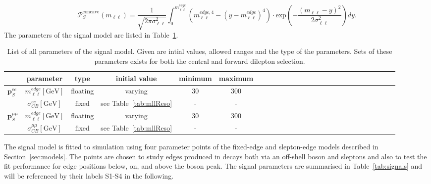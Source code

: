 \begin{equation}
 {\mathcal{P}}_{S}^{\text{concave}}(m_{\ell\ell}) = \frac{1}{\sqrt{2\pi\sigma_{\ell\ell}^2}} \int_{0}^{m_{\ell\ell}^{edge}} (m_{\ell\ell}^{edge,4} -(y-m_{\ell\ell}^{edge})^4) \cdot \textrm{exp}\left( -\frac{(m_{\ell\ell}-y)^2}{2\sigma_{\ell\ell}^{2}}\right) dy.
\end{equation}
The parameters of the signal model are listed in Table~\ref{tab:Fit_Par_Overview_Sig}.
\begin{table}[htbp]
\begin{center}
 \renewcommand{\arraystretch}{1.3}
 \caption{List of all parameters of the signal model. Given are intial values, allowed ranges and the type of the parameters. Sets of these parameters exists for both the central and forward dilepton selection.\label{tab:Fit_Par_Overview_Sig}}
\begin{tabular}{l|c|c|c|c|ccccccccccccccccccccc}
& parameter & type & initial value & minimum & maximum \\ \hline
\multirow{2}{*}{$\mathbf{p}_{S}^{ee}$} & $m_{\ell\ell}^{edge} [\mathrm{GeV}]$ & floating & varying & 30 & 300 \\ 
& $\sigma_{CB}^{ee}  [\mathrm{GeV}]$ & fixed & see Table~\ref{tab:mllReso} & - & - \\ \hline
\multirow{2}{*}{$\mathbf{p}_{S}^{\mu\mu}$} & $m_{\ell\ell}^{edge} [\mathrm{GeV}]$ & floating & varying & 30 & 300 \\ 
& $\sigma_{CB}^{\mu\mu}  [\mathrm{GeV}]$ & fixed & see Table~\ref{tab:mllReso} & - & - \\
\end{tabular}

\end{center}
\end{table}

The signal model is fitted to simulation using four parameter points of the fixed-edge and slepton-edge models described in Section~\ref{sec:models}. The points are chosen to study edges produced in decays both via an off-shell \Z boson and sleptons and also to test the fit performance for edge positions below, on, and above the \Z boson peak. The signal parameters are summarised in Table~\ref{tab:signals} and will be referenced by their labels S1-S4 in the following.

